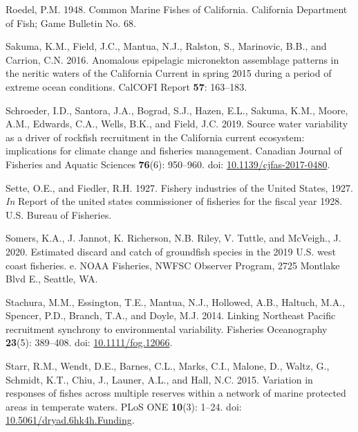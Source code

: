 \documentclass[
  english,
  a4paper,
]{article}
\newlength{\cslhangindent}
\newlength{\cslentryspacingunit} %
\newenvironment{CSLReferences}[2] %
 {%
  \setlength{\parindent}{0pt}
  \ifodd #1
  \let\oldpar\par
  \def\par{\hangindent=\cslhangindent\oldpar}
  \fi
  \setlength{\parskip}{#2\cslentryspacingunit}
 }%
 {}
\begin{document}
\begin{CSLReferences}{1}{0}
\leavevmode{}%
Roedel, P.M. 1948. {Common Marine Fishes of California}. California Department of Fish; Game Bulletin No. 68.

\leavevmode{}%
Sakuma, K.M., Field, J.C., Mantua, N.J., Ralston, S., Marinovic, B.B., and Carrion, C.N. 2016. {Anomalous epipelagic micronekton assemblage patterns in the neritic waters of the California Current in spring 2015 during a period of extreme ocean conditions}. CalCOFI Report \textbf{57}: 163--183.

\leavevmode{}%
Schroeder, I.D., Santora, J.A., Bograd, S.J., Hazen, E.L., Sakuma, K.M., Moore, A.M., Edwards, C.A., Wells, B.K., and Field, J.C. 2019. {Source water variability as a driver of rockfish recruitment in the California current ecosystem: implications for climate change and fisheries management}. Canadian Journal of Fisheries and Aquatic Sciences \textbf{76}(6): 950--960. doi: \href{https://doi.org/10.1139/cjfas-2017-0480}{10.1139/cjfas-2017-0480}.

\leavevmode{}%
Sette, O.E., and Fiedler, R.H. 1927. {Fishery industries of the United States, 1927}. \emph{In} Report of the united states commissioner of fisheries for the fiscal year 1928. U.S. Bureau of Fisheries.

\leavevmode{}%
Somers, K.A., J. Jannot, K. Richerson, N.B. Riley, V. Tuttle, and McVeigh., J. 2020. {Estimated discard and catch of groundfish species in the 2019 U.S. west coast fisheries. e}. NOAA Fisheries, NWFSC Observer Program, 2725 Montlake Blvd E., Seattle, WA.

\leavevmode{}%
Stachura, M.M., Essington, T.E., Mantua, N.J., Hollowed, A.B., Haltuch, M.A., Spencer, P.D., Branch, T.A., and Doyle, M.J. 2014. {Linking Northeast Pacific recruitment synchrony to environmental variability}. Fisheries Oceanography \textbf{23}(5): 389--408. doi: \href{https://doi.org/10.1111/fog.12066}{10.1111/fog.12066}.

\leavevmode{}%
Starr, R.M., Wendt, D.E., Barnes, C.L., Marks, C.I., Malone, D., Waltz, G., Schmidt, K.T., Chiu, J., Launer, A.L., and Hall, N.C. 2015. {Variation in responses of fishes across multiple reserves within a network of marine protected areas in temperate waters}. PLoS ONE \textbf{10}(3): 1--24. doi: \href{https://doi.org/10.5061/dryad.6hk4h.Funding}{10.5061/dryad.6hk4h.Funding}.


\end{CSLReferences}
\end{document}
